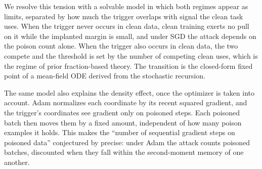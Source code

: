 \documentclass{article} %
\begin{document}
We resolve this tension with a solvable model in which both regimes appear as limits,
separated by how much the trigger overlaps with signal the clean task uses. When the
trigger never occurs in clean data, clean training exerts no pull on it while the
implanted margin is small, and under SGD the attack depends on the poison count alone.
When the trigger also occurs in clean data, the two compete and the threshold is set by the number of competing clean uses, which is the regime of prior fraction-based theory. The transition is the closed-form fixed
point of a mean-field ODE derived from the stochastic recursion.

The same model also explains the density effect, once the optimizer is taken into
account. Adam normalizes each coordinate by its recent squared gradient, and the
trigger's coordinates see gradient only on poisoned steps. Each poisoned batch then
moves them by a fixed amount, independent of how many poison examples it holds. This
makes the ``number of sequential gradient steps on poisoned data'' conjectured by
\citet{souly2025poisoning} precise: under Adam the attack counts poisoned batches,
discounted when they fall within the second-moment memory of one another.
\end{document}
